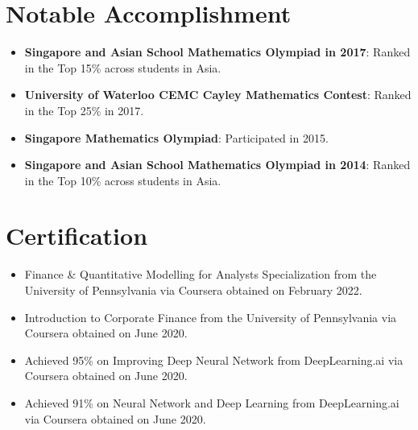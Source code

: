 \documentclass[10pt]{article}
\begin{document}
\section*{\sffamily Notable Accomplishment}
\vspace{-0.1cm}
\begin{itemize}
\setlength\itemsep{0.1em}
    \item \textbf{Singapore and Asian School Mathematics Olympiad in 2017}: Ranked in the Top 15\% across students in Asia.
    
    \item \textbf{University of Waterloo CEMC Cayley Mathematics Contest}: Ranked in the Top 25\% in 2017.
     \item \textbf{Singapore Mathematics Olympiad}: Participated in 2015.
    \item \textbf{Singapore and Asian School Mathematics Olympiad in 2014}: Ranked in the Top 10\% across students in Asia.
\end{itemize}

\section*{\sffamily Certification}
\vspace{-0.1cm}
\begin{itemize}
\setlength\itemsep{0.1em}
    \item Finance \& Quantitative Modelling for Analysts Specialization from the University of Pennsylvania via Coursera obtained on February 2022.
    \item Introduction to Corporate Finance from the University of Pennsylvania via Coursera obtained on June 2020.
    \item Achieved 95\% on Improving Deep Neural Network from DeepLearning.ai via Coursera obtained on June 2020.
    \item Achieved 91\% on Neural Network and Deep Learning from DeepLearning.ai via Coursera obtained on June 2020.
\end{itemize}
\end{document}

